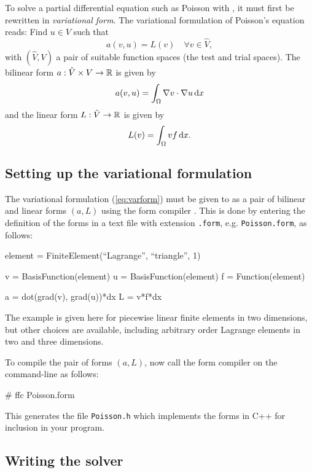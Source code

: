 To solve a partial differential equation such as Poisson
with \dolfin{}, it must first be rewritten in \emph{variational form}.
The variational formulation of Poisson's equation reads:
Find $u \in V$ such that
\begin{equation} \label{eq:varform}
  a(v, u) = L(v) \quad \forall v\in \hat{V}, 
\end{equation}
with $(\hat{V}, V)$ a pair of suitable function spaces (the test and
trial spaces). The bilinear form $a : \hat{V} \times V \rightarrow
\mathbb{R}$ is given by
\begin{equation}
  a(v, u) = \int_{\Omega} \nabla v \cdot \nabla u \, \mathrm{d}x
\end{equation}
and the linear form $L : \hat{V} \rightarrow \mathbb{R}$ is given by
\begin{equation}
  L(v) = \int_{\Omega} v f \, \mathrm{d}x.
\end{equation}

\subsection{Setting up the variational formulation}

The variational formulation (\ref{eq:varform}) must be given to
\dolfin{} as a pair of bilinear and linear forms $(a, L)$ using the
form compiler \ffc{}. This is done by entering the definition of
the forms in a text file with extension \texttt{.form},
e.g. \texttt{Poisson.form}, as follows:
\begin{code}
  element = FiniteElement(``Lagrange'', ``triangle'', 1)

  v = BasisFunction(element)
  u = BasisFunction(element)
  f = Function(element)
  
  a = dot(grad(v), grad(u))*dx
  L = v*f*dx
\end{code}

The example is given here for piecewise linear finite elements in two
dimensions, but other choices are available, including arbitrary order
Lagrange elements in two and three dimensions.

To compile the pair of forms $(a, L)$, now call the form compiler on
the command-line as follows:
\begin{code}
  # ffc Poisson.form
\end{code}
This generates the file \texttt{Poisson.h} which implements the forms
in C++ for inclusion in your \dolfin{} program.

\subsection{Writing the solver}

